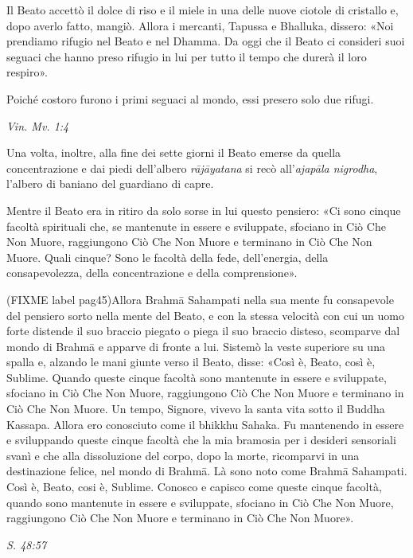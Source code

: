 Il Beato accettò il dolce di riso e il miele in una delle nuove ciotole
di cristallo e, dopo averlo fatto, mangiò. Allora i mercanti, Tapussa e
Bhalluka, dissero: «Noi prendiamo rifugio nel Beato e nel Dhamma. Da
oggi che il Beato ci consideri suoi seguaci che hanno preso rifugio in
lui per tutto il tempo che durerà il loro respiro».


Poiché costoro furono i primi seguaci al mondo, essi presero solo due
rifugi.


\emph{Vin. Mv. 1:4}


 Una volta, inoltre, alla fine dei sette giorni il Beato
emerse da quella concentrazione e dai piedi dell’albero \emph{rājāyatana} si
recò all’\emph{ajapāla nigrodha}, l’albero di baniano del guardiano di capre.


 Mentre il Beato era in ritiro da solo sorse in lui questo
pensiero: «Ci sono cinque facoltà spirituali che, se mantenute in essere
e sviluppate, sfociano in Ciò Che Non Muore, raggiungono Ciò Che Non
Muore e terminano in Ciò Che Non Muore. Quali cinque? Sono le facoltà
della fede, dell’energia, della consapevolezza, della concentrazione e
della comprensione».


(FIXME label pag45)Allora Brahmā Sahampati nella sua mente fu consapevole del pensiero
sorto nella mente del Beato, e con la stessa velocità con cui un uomo
forte distende il suo braccio piegato o piega il suo braccio disteso,
scomparve dal mondo di Brahmā e apparve di fronte a lui. Sistemò la
veste superiore su una spalla e, alzando le mani giunte verso il Beato,
disse: «Così è, Beato, così è, Sublime. Quando queste cinque facoltà
sono mantenute in essere e sviluppate, sfociano in Ciò Che Non Muore,
raggiungono Ciò Che Non Muore e terminano in Ciò Che Non Muore. Un
tempo, Signore, vivevo la santa vita sotto il Buddha Kassapa. Allora ero
conosciuto come il bhikkhu Sahaka. Fu mantenendo in essere e sviluppando
queste cinque facoltà che la mia bramosia per i desideri sensoriali
svanì e che alla dissoluzione del corpo, dopo la morte, ricomparvi in
una destinazione felice, nel mondo di Brahmā. Là sono noto come Brahmā
Sahampati. Così è, Beato, cosi è, Sublime. Conosco e capisco come queste
cinque facoltà, quando sono mantenute in essere e sviluppate, sfociano
in Ciò Che Non Muore, raggiungono Ciò Che Non Muore e terminano in Ciò
Che Non Muore».


\emph{S. 48:57}


